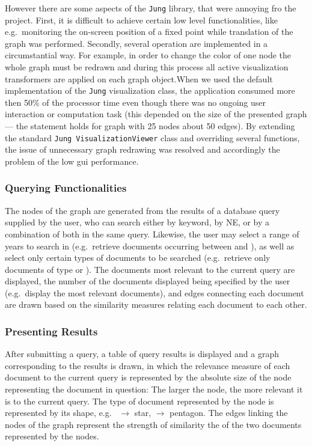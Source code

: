 However there are some aspects of the \texttt{Jung} library, that were annoying fro the project.
First, it is difficult to achieve certain low level functionalities, like e.g.\ monitoring the
on-screen position of a fixed point while translation of the graph was performed. Secondly, several
operation are implemented in a circumstantial way. For example, in order to change the color of
one node the whole graph must be redrawn and during this process all active visualization
transformers are applied on each graph object.When we used the default implementation of the
\texttt{Jung} visualization class, the application consumed more then 50\% of the processor time
even though there was no ongoing user interaction or computation task (this depended on the size of
the presented graph --- the statement holds for graph with 25 nodes about 50 edges). By extending
the standard \texttt{Jung VisualizationViewer} class and overriding several functions, the issue of
unnecessary graph redrawing was resolved and accordingly the problem of the low gui performance.

\subsubsection {Querying Functionalities}
\label{sec:querying_functionalities}
The nodes of the graph are generated from the results of a database query supplied by the user, who
can search either by keyword, by NE, or by a combination of both in the same query. Likewise, the
user may select a range of years to search in (e.g.\ retrieve documents occurring between
 and ), as well as select only certain types of documents to be searched
(e.g.\ retrieve only documents of type  or ). The documents most
relevant to the current query are displayed, the number of the documents displayed being specified
by the user (e.g.\ display the  most relevant documents), and edges connecting each
document are drawn based on the similarity measures relating each document to each other.

\subsubsection {Presenting Results}
\label{sec:presenting_results}
After submitting a query, a table of query results is displayed and a graph corresponding to the
results is drawn, in which the relevance measure of each document to the current query is
represented by the absolute size of the node representing the document in question: The larger the
node, the more relevant it is to the current query. The type of document represented by the node is
represented by its shape, e.g.\  $\rightarrow$ star,  $\rightarrow$
pentagon. The edges linking the nodes of the graph represent the strength of similarity the of the
two documents represented by the nodes.
